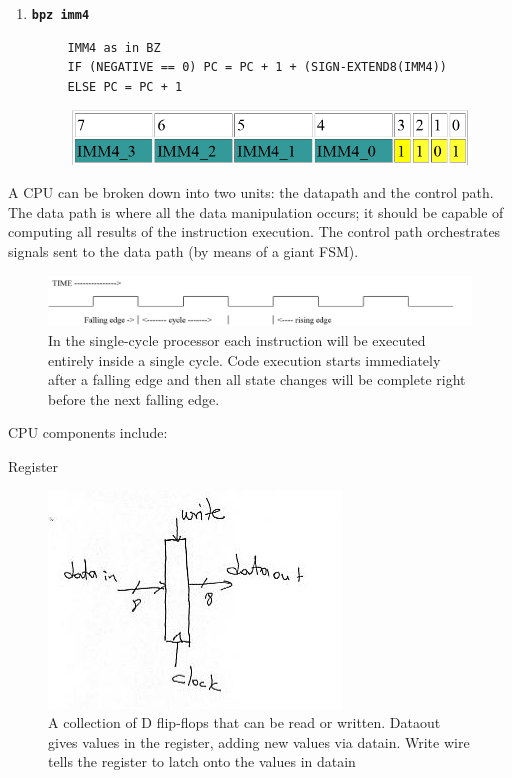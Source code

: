 \documentclass[../notes.tex]{subfiles}
\begin{document}
\begin{enumerate}
	\item \textbf{\texttt{bpz imm4}}
		\begin{listing}[H]
		\begin{verbatim}
     IMM4 as in BZ
     IF (NEGATIVE == 0) PC = PC + 1 + (SIGN-EXTEND8(IMM4))
     ELSE PC = PC + 1
		\end{verbatim}
		\end{listing}
		\begin{figure}[H]
			\centering
			\includegraphics[width=0.8\linewidth]{img/image_2022-11-03-14-59-46.png}
		\end{figure}

\end{enumerate}


A CPU can be broken down into two units: the datapath and the control path. The data path is where all the data manipulation occurs; it should be capable of computing all results of the instruction execution.
The control path orchestrates signals sent to the data path (by means of a giant FSM).

\begin{figure}[H]
	\centering
	\includegraphics[width=0.8\linewidth]{img/image_2022-12-10-15-35-41.png}
	\caption{In the single-cycle processor each instruction will be executed entirely inside a single cycle. Code execution starts immediately after a falling edge and then all state changes will be complete right before the next falling edge.}
\end{figure}

CPU components include:

\begin{definition}
	Register
	\begin{figure}[H]
		\centering
		\includegraphics[width=0.8\linewidth]{img/image_2022-12-10-15-37-08.png}
		\caption{A collection of D flip-flops that can be read or written. Dataout gives values in the register, adding new values via datain. Write wire tells the register to latch onto the values in datain}
	\end{figure}
\end{definition}
\end{document}
